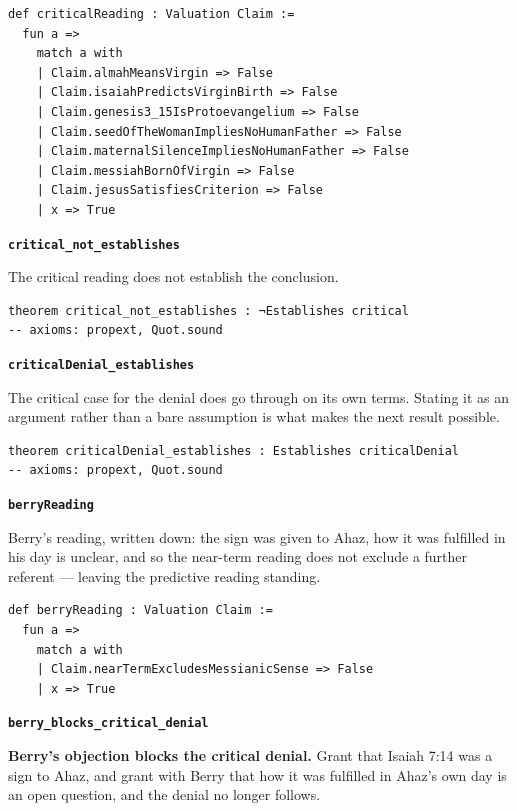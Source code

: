 \documentclass[11pt]{article}
\begin{document}
{\small\begin{verbatim}
def criticalReading : Valuation Claim :=
  fun a =>
    match a with
    | Claim.almahMeansVirgin => False
    | Claim.isaiahPredictsVirginBirth => False
    | Claim.genesis3_15IsProtoevangelium => False
    | Claim.seedOfTheWomanImpliesNoHumanFather => False
    | Claim.maternalSilenceImpliesNoHumanFather => False
    | Claim.messiahBornOfVirgin => False
    | Claim.jesusSatisfiesCriterion => False
    | x => True
\end{verbatim}}
\par\medskip\noindent\textbf{\texttt{critical\_\allowbreak{}not\_\allowbreak{}establishes}}\par\nobreak\noindent
The critical reading does not establish the conclusion.

{\small\begin{verbatim}
theorem critical_not_establishes : ¬Establishes critical
-- axioms: propext, Quot.sound
\end{verbatim}}
\par\medskip\noindent\textbf{\texttt{critical\allowbreak{}Denial\_\allowbreak{}establishes}}\par\nobreak\noindent
The critical case for the denial does go through on its own terms. Stating it as an argument rather than a bare assumption is what makes the next result possible.

{\small\begin{verbatim}
theorem criticalDenial_establishes : Establishes criticalDenial
-- axioms: propext, Quot.sound
\end{verbatim}}
\par\medskip\noindent\textbf{\texttt{berry\allowbreak{}Reading}}\par\nobreak\noindent
Berry’s reading, written down: the sign was given to Ahaz, how it was fulfilled in his day is unclear, and so the near-term reading does not exclude a further referent — leaving the predictive reading standing.

{\small\begin{verbatim}
def berryReading : Valuation Claim :=
  fun a =>
    match a with
    | Claim.nearTermExcludesMessianicSense => False
    | x => True
\end{verbatim}}
\par\medskip\noindent\textbf{\texttt{berry\_\allowbreak{}blocks\_\allowbreak{}critical\_\allowbreak{}denial}}\par\nobreak\noindent
\textbf{Berry’s objection blocks the critical denial.} Grant that Isaiah 7:14 was a sign to Ahaz, and grant with Berry that how it was fulfilled in Ahaz’s own day is an open question, and the denial no longer follows.
\end{document}

